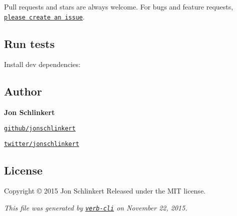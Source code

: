 Pull requests and stars are always welcome. For bugs and feature requests, \href{https://github.com/jonschlinkert/is-number/issues/new}{\tt please create an issue}.

\subsection*{Run tests}

Install dev dependencies\+:




\subsection*{Author}

{\bfseries Jon Schlinkert}


\begin{DoxyItemize}
\item \href{https://github.com/jonschlinkert}{\tt github/jonschlinkert}
\item \href{http://twitter.com/jonschlinkert}{\tt twitter/jonschlinkert}
\end{DoxyItemize}

\subsection*{License}

Copyright © 2015 Jon Schlinkert Released under the M\+IT license.





{\itshape This file was generated by \href{https://github.com/assemble/verb-cli}{\tt verb-\/cli} on November 22, 2015.} 